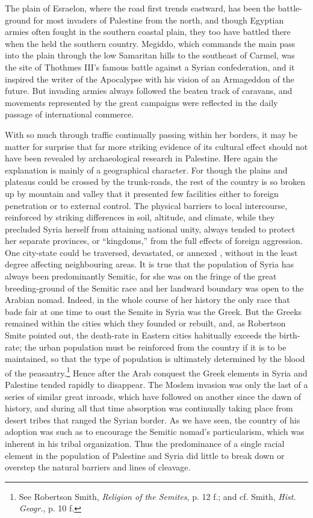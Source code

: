\documentclass[12pt,oneside]{book}
\begin{document}
The plain of Esraelon, where the road first trends eastward, has been the battle-ground for most invaders of Palestine from the north, and though Egyptian armies often fought in the southern coastal plain, they too have battled there when the held the southern country. Megiddo, which commands the main pass into the plain through the low Samaritan hills to the southeast of Carmel, was the site of Thothmes III's famous battle against a Syrian confederation, and it inspired the writer of the Apocalypse with his vision of an Armageddon of the future. But invading armies always followed the beaten track of caravans, and movements represented by the great campaigns were reflected in the daily passage of international commerce. \par 

With so much through traffic continually passing within her borders, it may be matter for surprise that far more striking evidence of its cultural effect should not have been revealed by archaeological research in Palestine. Here again the explanation is mainly of a geographical character. For though the plains and plateaus could be crossed by the trunk-roads, the rest of the country is so broken up by mountain and valley that it presented few facilities either to foreign penetration or to external control. The physical barriers to local intercourse, reinforced by striking differences in soil, altitude, and climate, while they precluded Syria herself from attaining national unity, always tended to protect her separate provinces, or ``kingdoms,'' from the full effects of foreign aggression. One city-state could be traversed, devastated, or annexed , without in the least degree affecting neighbouring areas. It is true that the population of Syria has always been predominantly Semitic, for she was on the fringe of the great breeding-ground of the Semitic race and her landward boundary was open to the Arabian nomad. Indeed, in the whole course of her history the only race that bade fair at one time to oust the Semite in Syria was the Greek. But the Greeks remained within the cities which they founded or rebuilt, and, as Robertson Smite pointed out, the death-rate in Eastern cities habitually exceeds the birth-rate; the urban population must be reinforced from the country if it is to be maintained, so that the type of population is ultimately determined by the blood of the peasantry.\footnote{See Robertson Smith, \textit{Religion of the Semites}, p. 12 f.; and cf. Smith, \textit{Hist. Geogr.}, p. 10 f.} Hence after the Arab conquest the Greek elements in Syria and Palestine tended rapidly to disappear. The Moslem invasion was only the last of a series of similar great inroads, which have followed on another since the dawn of history, and during all that time absorption was continually taking place from desert tribes that ranged the Syrian border. As we have seen, the country of his adoption was such as to encourage the Semitic nomad's particularism, which was inherent in his tribal organization. Thus the predominance of a single racial element in the population of Palestine and Syria did little to break down or overstep the natural barriers and lines of cleavage. \par 
\end{document}
